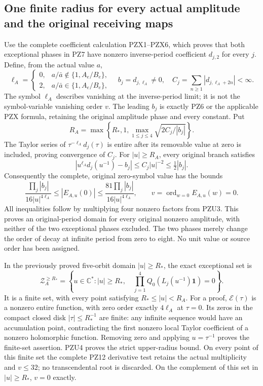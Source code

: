 \subsection{One finite radius for every actual amplitude and the original receiving maps}
Use the complete coefficient calculation PZX1--PZX6, which proves that
both exceptional phases in PZ7 have nonzero inverse-period coefficient
$d_{j,2}$ for every $j$. Define, from the actual value $a$,
\[
 \ell_A=\begin{cases}0,&a/\bar a\notin\{1,A_e/B_e\},\\
                      2,&a/\bar a\in\{1,A_e/B_e\},\end{cases}
 \quad b_j=d_{j,\ell_A}\ne0,\quad
 C_j=\sum_{n\ge1}|d_{j,\ell_A+2n}|<\infty.
 \tag{PZU1}
\]
The symbol $\ell_A$ describes vanishing at the inverse-period limit;
it is not the symbol-variable vanishing order $v$. The leading
$b_j$ is exactly PZ6 or the applicable PZX formula, retaining the
original amplitude phase and every constant. Put
\[
 R_A=\max\left\{R_*,1,
           \max_{1\le j\le4}\sqrt{2C_j/|b_j|}\right\}.
 \tag{PZU2}
\]
The Taylor series of $\tau^{-\ell_A}d_j(\tau)$ is entire after
its removable value at zero is included, proving convergence of $C_j$.
For $|u|\ge R_A$, every original branch satisfies
\[
 \left|u^{\ell_A}d_j(u^{-1})-b_j\right|
        \le C_j|u|^{-2}\le\tfrac12|b_j|.
 \tag{PZU3}
\]
Consequently the complete, original zero-symbol value has the bounds
\[
 \boxed{\quad
 \frac{\prod_j|b_j|}{16|u|^{4\ell_A}}
 \le |E_{A,u}(0)|
 \le \frac{81\prod_j|b_j|}{16|u|^{4\ell_A}},
 \qquad v=\operatorname{ord}_{w=0}E_{A,u}(w)=0.
 \quad}\tag{PZU4}
\]
All inequalities follow by multiplying four nonzero factors from PZU3.
This proves an original-period domain for every original nonzero
amplitude, with neither of the two exceptional phases excluded.
The two phases merely change the order of decay at infinite period
from zero to eight. No unit value or source order has been assigned.

In the previously proved five-orbit domain $|u|\ge R_*$, the exact
exceptional set is
\[
 \mathcal Z_A^{\ge R_*}
 =\left\{u\in\mathbb C^*:|u|\ge R_*,\quad
     \prod_{j=1}^4Q_0(L_j(u^{-1})\boldsymbol1)=0\right\}.
 \tag{PZU5}
\]
It is a finite set, with every point satisfying $R_*\le|u|<R_A$.
For a proof, $\mathcal E(\tau)$ is a nonzero entire function, with
zero order exactly $4\ell_A$ at $\tau=0$. Its zeros in the compact
closed disk $|\tau|\le R_*^{-1}$ are finite: any infinite sequence
would have an accumulation point, contradicting the first nonzero
local Taylor coefficient of a nonzero holomorphic function. Removing
zero and applying $u=\tau^{-1}$ proves the finite-set assertion.
PZU4 proves the strict upper-radius bound. On every point of this
finite set the complete PZ12 derivative test retains the actual
multiplicity and $v\le32$; no transcendental root is discarded.
On the complement of this set in $|u|\ge R_*$, $v=0$ exactly.

